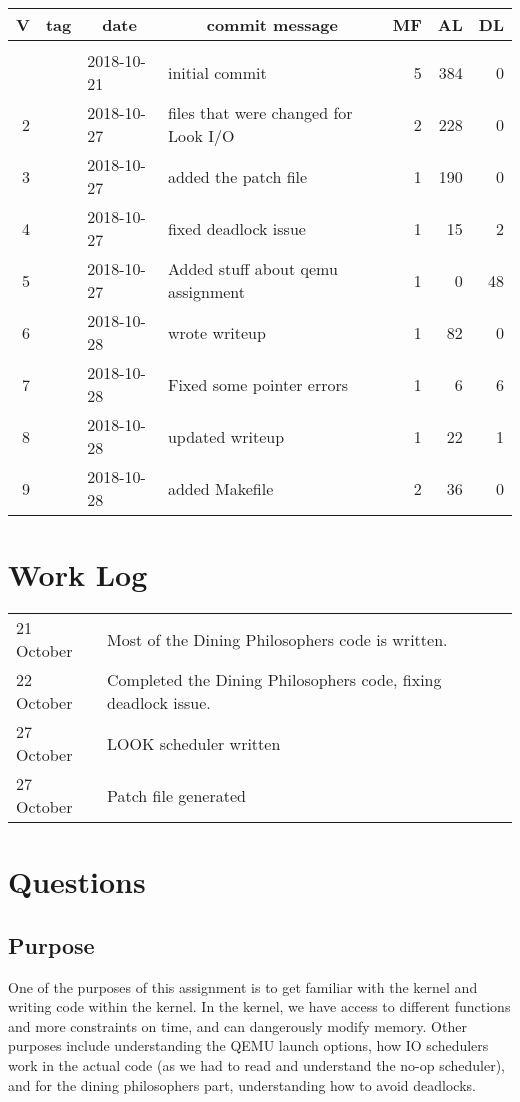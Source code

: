 \documentclass[letterpaper,10pt]{article}
\begin{document}
	\begin{longtable}{|rlllrrr|}
	\hline \multicolumn{1}{|c}{\textbf{V}} & \multicolumn{1}{c}{\textbf{tag}}
	& \multicolumn{1}{c}{\textbf{date}}
	& \multicolumn{1}{c}{\textbf{commit message}} & \multicolumn{1}{c}{\textbf{MF}}
	& \multicolumn{1}{c}{\textbf{AL}} & \multicolumn{1}{c|}{\textbf{DL}} \\ \hline
	\endhead
	
	\hline  \\ \hline
	\endfoot
	
	\hline%
	\endlastfoot
	
	\hline 1 &  & 2018-10-21 & initial commit & 5 & 384 & 0 \\
	\hline 2 &  & 2018-10-27 & files that were changed for Look I/O & 2 & 228 & 0 \\
	\hline 3 &  & 2018-10-27 & added the patch file & 1 & 190 & 0 \\
	\hline 4 &  & 2018-10-27 & fixed deadlock issue & 1 & 15 & 2 \\
	\hline 5 &  & 2018-10-27 & Added stuff about qemu assignment & 1 & 0 & 48 \\
	\hline 6 &  & 2018-10-28 & wrote writeup & 1 & 82 & 0 \\
	\hline 7 &  & 2018-10-28 & Fixed some pointer errors & 1 & 6 & 6 \\
	\hline 8 &  & 2018-10-28 & updated writeup & 1 & 22 & 1 \\
	\hline 9 &  & 2018-10-28 & added Makefile & 2 & 36 & 0 \\
	\end{longtable}
	
	\section{Work Log}
	\begin{tabular}{l l}
		21 October & Most of the Dining Philosophers code is written. \\
		22 October & Completed the Dining Philosophers code, fixing deadlock issue.\\
		27 October & LOOK scheduler written \\
		27 October & Patch file generated \\
	\end{tabular}
	
	\section{Questions}
	\subsection{Purpose}
	One of the purposes of this assignment is to get familiar with the kernel and writing code within the kernel. In the kernel, we have access to different functions and more constraints on time, and can dangerously modify memory. Other purposes include understanding the QEMU launch options, how IO schedulers work in the actual code (as we had to read and understand the no-op scheduler), and for the dining philosophers part, understanding how to avoid deadlocks.
	
\end{document}
